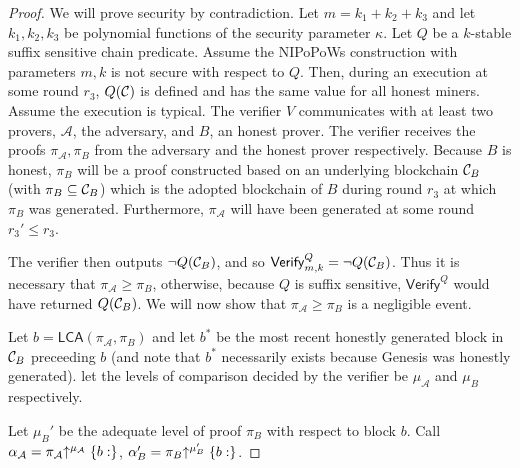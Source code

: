 \begin{proof}
    We will prove security by contradiction.  Let $m = k_1 + k_2 + k_3$ and let
    $k_1, k_2, k_3$ be polynomial functions of the security parameter $\kappa$.
    Let $Q$ be a $k$-stable suffix sensitive chain predicate. Assume the
    NIPoPoWs construction with parameters $m, k$ is not secure with respect to
    $Q$. Then, during an execution at some round $r_3$, $Q(\mathcal{C})$ is defined
    and has the same value for all honest miners.  Assume the execution is
    typical. The verifier $V$ communicates with at least two provers,
    $\mathcal{A}$, the adversary, and $B$, an honest prover.  The verifier
    receives the proofs $\pi_\mathcal{A}, \pi_B$ from the adversary
    and the honest prover respectively. Because $B$ is
    honest, $\pi_B$ will be a proof constructed based on an underlying
    blockchain $\mathcal{C}_B$ (with $\pi_B \subseteq \mathcal{C}_B$) which is the adopted blockchain of $B$ during round
    $r_3$ at which $\pi_B$ was generated. Furthermore,
    $\pi_\mathcal{A}$ will have been generated at some round $r_3' \leq
    r_3$.

    The verifier then outputs $\lnot Q(\mathcal{C}_B)$, and so
    $\textsf{Verify}^Q_{m,k} = \lnot Q(\mathcal{C}_B)$. Thus it is necessary that
    $\pi_\mathcal{A} \geq \pi_B$, otherwise, because $Q$
    is suffix sensitive, $\textsf{Verify}^Q$ would have returned $Q(\mathcal{C}_B)$.
    We will now show that $\pi_\mathcal{A} \geq \pi_B$ is
    a negligible event.

    Let $b = \textsf{LCA}(\pi_\mathcal{A}, \pi_B)$ and let $b^*$ be
    the most recent honestly generated block in $\mathcal{C}_B$ preceeding $b$ (and note that $b^*$ necessarily exists because Genesis was honestly generated).
    let the levels of comparison decided by the verifier be $\mu_\mathcal{A}$
    and $\mu_B$ respectively.

    Let $\mu_B'$ be the adequate level of proof $\pi_B$ with respect to block
    $b$. Call $\alpha_\mathcal{A} =
    \pi_\mathcal{A}\negthickspace\uparrow^{\mu_\mathcal{A}}\{b:\}$,
    $\alpha'_B = \pi_B\negthickspace\uparrow^{\mu_B'}\{b:\}$.


%


\end{proof}
